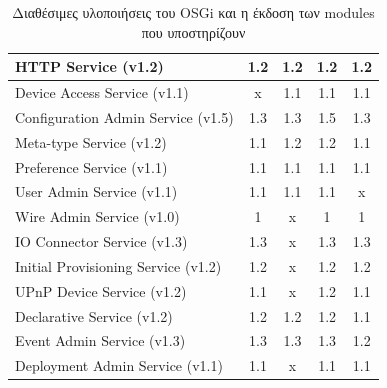\begin{table}[h]
{\begin{tabular}{|l|c|c|c|c|}
HTTP Service (v1.2) & \cellcolor[HTML]{32CB00}1.2 & \cellcolor[HTML]{32CB00}1.2 & \cellcolor[HTML]{32CB00}1.2 & \cellcolor[HTML]{32CB00}1.2 \\ \hline
Device Access Service (v1.1) & \cellcolor[HTML]{FE0000}x & \cellcolor[HTML]{32CB00}1.1 & \cellcolor[HTML]{32CB00}1.1 & \cellcolor[HTML]{32CB00}1.1 \\ \hline
Configuration Admin Service (v1.5) & \cellcolor[HTML]{F56B00}1.3 & \cellcolor[HTML]{F56B00}1.3 & \cellcolor[HTML]{32CB00}1.5 & \cellcolor[HTML]{F56B00}1.3 \\ \hline
Meta-type Service (v1.2) & \cellcolor[HTML]{F56B00}1.1 & \cellcolor[HTML]{32CB00}1.2 & \cellcolor[HTML]{32CB00}1.2 & \cellcolor[HTML]{F56B00}1.1 \\ \hline
Preference Service (v1.1) & \cellcolor[HTML]{32CB00}1.1 & \cellcolor[HTML]{32CB00}1.1 & \cellcolor[HTML]{32CB00}1.1 & \cellcolor[HTML]{32CB00}1.1 \\ \hline
User Admin Service (v1.1) & \cellcolor[HTML]{32CB00}1.1 & \cellcolor[HTML]{32CB00}1.1 & \cellcolor[HTML]{32CB00}1.1 & \cellcolor[HTML]{FE0000}x \\ \hline
Wire Admin Service (v1.0) & \cellcolor[HTML]{32CB00}1 & \cellcolor[HTML]{FE0000}x & \cellcolor[HTML]{32CB00}1 & \cellcolor[HTML]{32CB00}1 \\ \hline
IO Connector Service (v1.3) & \cellcolor[HTML]{32CB00}1.3 & \cellcolor[HTML]{FE0000}x & \cellcolor[HTML]{32CB00}1.3 & \cellcolor[HTML]{32CB00}1.3 \\ \hline
Initial Provisioning Service (v1.2) & \cellcolor[HTML]{32CB00}1.2 & \cellcolor[HTML]{FE0000}x & \cellcolor[HTML]{32CB00}1.2 & \cellcolor[HTML]{32CB00}1.2 \\ \hline
UPnP Device Service (v1.2) & \cellcolor[HTML]{F56B00}1.1 & \cellcolor[HTML]{FE0000}x & \cellcolor[HTML]{32CB00}1.2 & \cellcolor[HTML]{F56B00}1.1 \\ \hline
Declarative Service (v1.2) & \cellcolor[HTML]{32CB00}1.2 & \cellcolor[HTML]{32CB00}1.2 & \cellcolor[HTML]{32CB00}1.2 & \cellcolor[HTML]{F56B00}1.1 \\ \hline
Event Admin Service (v1.3) & \cellcolor[HTML]{32CB00}1.3 & \cellcolor[HTML]{32CB00}1.3 & \cellcolor[HTML]{32CB00}1.3 & \cellcolor[HTML]{F56B00}1.2 \\ \hline
Deployment Admin Service (v1.1) & \cellcolor[HTML]{32CB00}1.1 & \cellcolor[HTML]{FE0000}x & \cellcolor[HTML]{32CB00}1.1 & \cellcolor[HTML]{32CB00}1.1 \\ \hline
\end{tabular}%
}
\caption{Διαθέσιμες υλοποιήσεις του OSGi και η έκδοση των modules που υποστηρίζουν}
\label{my-label}
\end{table}

